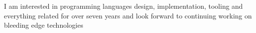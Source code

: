 I am interested in programming languages design, implementation, tooling and everything related for over seven years and look forward to continuing working on bleeding edge technologies
